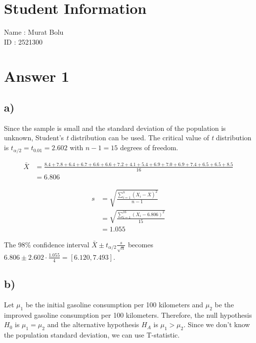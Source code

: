 \documentclass[12pt]{article}
\begin{document}
\section*{Student Information}

Name : Murat Bolu \\

ID : 2521300 \\


\section*{Answer 1}
\subsection*{a)}

Since the sample is small and the standard deviation of the population is
unknown, Student's \textit{t} distribution can be used. The critical value of
\textit{t} distribution is $\textit{t}_{\alpha/2} = \textit{t}_{0.01} = 2.602$
with $n-1=15$ degrees of freedom.

\begin{align*}
    \bar{X}&= \frac{8.4+7.8+6.4+6.7+6.6+6.6+7.2+4.1+
                    5.4+6.9+7.0+6.9+7.4+6.5+6.5+8.5}{16} \\[0.75ex]
    &= 6.806
\end{align*}

\begin{align*}
    s &= \sqrt{\frac{\sum_{i=1}^{n}(X_i - \bar{X})^2 }{n-1}} \\[0.75ex]
    &= \sqrt{\frac{\sum_{i=1}^{16}(X_i - 6.806)^2}{15}} \\[0.75ex]
    &= 1.055
\end{align*}

The 98\% confidence interval $\bar{X} \pm \textit{t}_{\alpha/2}
\frac{s}{\sqrt{n}}$ becomes $6.806 \pm 2.602 \cdot \frac{1.055}{4} =
[6.120,7.493]$.

\subsection*{b)}

Let $\mu_1$ be the initial gasoline consumption per 100 kilometers and $\mu_2$
be the improved gasoline consumption per 100 kilometers. Therefore, the null
hypothesis $H_0$ is $\mu_1 = \mu_2$ and the alternative hypothesis $H_A$ is
$\mu_1 > \mu_2$. Since we don't know the population standard deviation, we can
use T-statistic.
\end{document}
